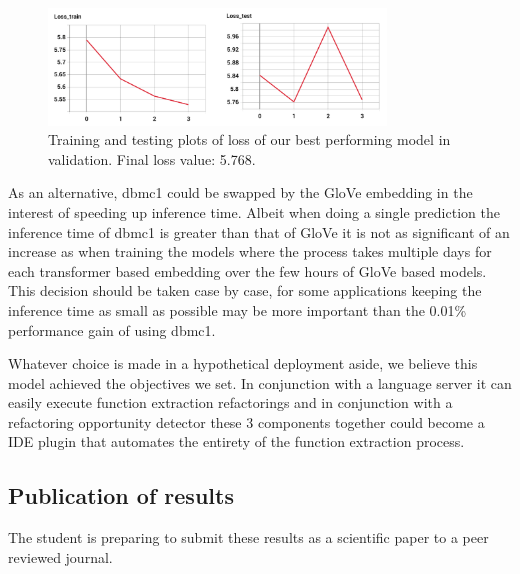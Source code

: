 \begin{figure}[!ht]
\centerline{\includegraphics[width=0.8\textwidth]{figuras/best_model_-Loss.png}   }
\caption{Training and testing plots of loss of our best performing model in validation. Final loss value: 5.768.}
\label{best_loss}
\end{figure}


As an alternative, dbmc1 could be swapped by the GloVe embedding in the interest of speeding up inference time. Albeit when doing a single prediction the inference time of dbmc1 is greater than that of GloVe it is not as significant of an increase as when training the models where the process takes multiple days for each transformer based embedding over the few hours of GloVe based models. This decision should be taken case by case, for some applications keeping the inference time as small as possible may be more important than the 0.01\% performance gain of using dbmc1.



Whatever choice is made in a hypothetical deployment aside, we believe this model achieved the objectives we set. In conjunction with a language server it can easily execute function extraction refactorings and in conjunction with a refactoring opportunity detector these 3 components together could become a IDE plugin that automates the entirety of the function extraction process.

\subsection{Publication of results}

The student is preparing to submit these results as a scientific paper to a peer reviewed journal.


